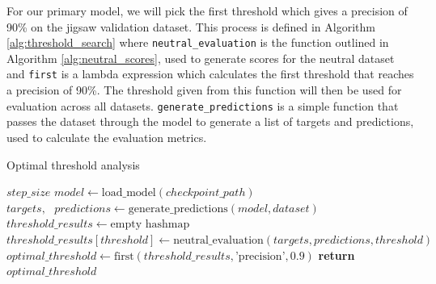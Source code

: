 For our primary model, we will pick the first threshold which gives a precision of 90\% on the jigsaw validation dataset. This process is defined in Algorithm \ref{alg:threshold_search} where \verb|neutral_evaluation| is the function outlined in Algorithm \ref{alg:neutral_scores}, used to generate scores for the neutral dataset and \verb|first| is a lambda expression which calculates the first threshold that reaches a precision of 90\%. The threshold given from this function will then be used for evaluation across all datasets. \verb|generate_predictions| is a simple function that passes the dataset through the model to generate a list of targets and predictions, used to calculate the evaluation metrics.

\begin{algorithm}[H]
    \caption{Optimal threshold analysis}
    \begin{algorithmic}[1]
        \Require $step\_size$
        \State $model \gets \text{load\_model}(checkpoint\_path)$
        \State $targets,\text{ }predictions \gets \text{generate\_predictions}(model, dataset)$
        \State
        \State $threshold\_results \gets \text{empty hashmap}$
        \State $threshold\_results[threshold] \gets \text{neutral\_evaluation}(targets, predictions, threshold)$
        \EndFor
        \State $optimal\_threshold \gets \text{first}(threshold\_results, \text{'precision'}, 0.9) $
        \State
        \State \textbf{return} $optimal\_threshold$
        \EndFunction
    \end{algorithmic}
    \label{alg:threshold_search}
\end{algorithm}
